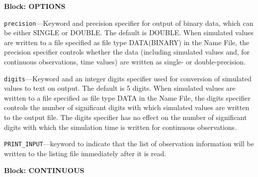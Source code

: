 
\item \textbf{Block: OPTIONS}

\begin{description}
\item \texttt{precision}---Keyword and precision specifier for output of binary data, which can be either SINGLE or DOUBLE. The default is DOUBLE. When simulated values are written to a file specified as file type DATA(BINARY) in the Name File, the precision specifier controls whether the data (including simulated values and, for continuous observations, time values) are written as single- or double-precision.

\item \texttt{digits}---Keyword and an integer digits specifier used for conversion of simulated values to text on output. The default is 5 digits. When simulated values are written to a file specified as file type DATA in the Name File, the digits specifier controls the number of significant digits with which simulated values are written to the output file. The digits specifier has no effect on the number of significant digits with which the simulation time is written for continuous observations.

\item \texttt{PRINT\_INPUT}---keyword to indicate that the list of observation information will be written to the listing file immediately after it is read.

\end{description}
\item \textbf{Block: CONTINUOUS}

